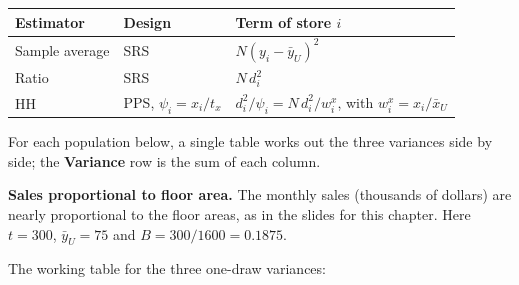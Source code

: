 \documentclass[
  letterpaper,
  DIV=11,
  numbers=noendperiod]{scrreprt}
\newcounter{none} %
\renewcommand{\[}{\begin{equation}}
\renewcommand{\]}{\end{equation}}
\begin{document}
{\def\LTcaptype{none} %
\begin{longtable}[]{@{}
  >{\raggedright\arraybackslash}p{}
  >{\raggedright\arraybackslash}p{}
  >{\raggedright\arraybackslash}p{}@{}}
\toprule\noalign{}
\begin{minipage}[b]{\linewidth}\raggedright
Estimator
\end{minipage} & \begin{minipage}[b]{\linewidth}\raggedright
Design
\end{minipage} & \begin{minipage}[b]{\linewidth}\raggedright
Term of store \(i\)
\end{minipage} \\
\midrule\noalign{}
\endhead
\bottomrule\noalign{}
\endlastfoot
Sample average & SRS & \(N(y_i-\bar{y}_U)^2\) \\
Ratio & SRS & \(N\,d_i^2\) \\
HH & PPS, \(\psi_i=x_i/t_x\) & \(d_i^2/\psi_i=N\,d_i^2/w^x_i\), with
\(w^x_i=x_i/\bar{x}_U\) \\
\end{longtable}
}

For each population below, a single table works out the three variances
side by side; the \textbf{Variance} row is the sum of each column.

\textbf{Sales proportional to floor area.} The monthly sales (thousands
of dollars) are nearly proportional to the floor areas, as in the slides
for this chapter. Here \(t=300\), \(\bar{y}_U=75\) and
\(B=300/1600=0.1875\).

The working table for the three one-draw variances:
\end{document}
